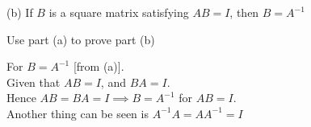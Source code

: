 \documentclass[addpoints]{exam}
\begin{document}
\begin{sloppypar}
\begin{questions}
    (b) If $B$ is a square matrix satisfying $AB = I$, then $ B = A^{-1} $

    Use part (a) to prove part (b)

    \begin{solution}
        For $ B = A^{-1} $ [from (a)]. \\ Given that $ AB = I $, and $BA = I$. \\ 
        Hence $ AB = BA = I \implies B = A^{-1} $ for $AB = I$. \\ Another thing can be seen is $ A^{-1}A = A A^{-1} = I $
    \end{solution}



    
    
\end{questions}
\end{sloppypar}
\end{document}
